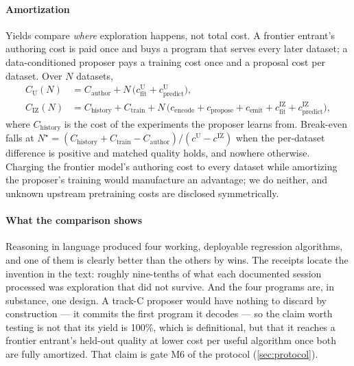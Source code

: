 \paragraph{Amortization} Yields compare \emph{where} exploration happens, not total cost. A frontier
entrant's authoring cost is paid once and buys a program that serves every later dataset; a
data-conditioned proposer pays a training cost once and a proposal cost per dataset. Over $N$
datasets,
\begin{align}
C_{\mathrm{U}}(N) &= C_{\mathrm{author}} + N\,\bigl(c_{\mathrm{fit}}^{\mathrm{U}} + c_{\mathrm{predict}}^{\mathrm{U}}\bigr),\\
C_{\mathrm{IZ}}(N) &= C_{\mathrm{history}} + C_{\mathrm{train}} + N\,\bigl(c_{\mathrm{encode}} + c_{\mathrm{propose}} + c_{\mathrm{emit}} + c_{\mathrm{fit}}^{\mathrm{IZ}} + c_{\mathrm{predict}}^{\mathrm{IZ}}\bigr),
\end{align}
where $C_{\mathrm{history}}$ is the cost of the experiments the proposer learns from. Break-even
falls at $N^\star = (C_{\mathrm{history}} + C_{\mathrm{train}} - C_{\mathrm{author}})/(c^{\mathrm{U}} -
c^{\mathrm{IZ}})$ when the per-dataset difference is positive and matched quality holds, and nowhere
otherwise. Charging the frontier model's authoring cost to every dataset while amortizing the
proposer's training would manufacture an advantage; we do neither, and unknown upstream pretraining
costs are disclosed symmetrically.

\paragraph{What the comparison shows} Reasoning in language produced four working, deployable
regression algorithms, and one of them is clearly better than the others by wins. The receipts
locate the invention in the text: roughly nine-tenths of what each documented session processed was
exploration that did not survive. And the four programs are, in substance, one design. A track-C
proposer would have nothing to discard by construction --- it commits the first program it decodes ---
so the claim worth testing is not that its yield is 100\%, which is definitional, but that it reaches
a frontier entrant's held-out quality at lower cost per useful algorithm once both are fully
amortized. That claim is gate M6 of the protocol (\cref{sec:protocol}).
